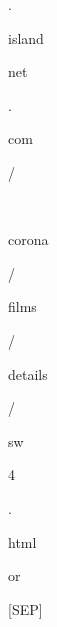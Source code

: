 \documentclass[varwidth=150mm]{standalone}
\begin{document}
\begin{CJK*}{UTF8}{gbsn}
{{{\colorbox{red!0.0}{\strut .} \colorbox{red!12.298245429992676}{\strut island}\colorbox{red!1.145770788192749}{\strut net} \colorbox{red!0.0}{\strut .} \colorbox{red!0.0}{\strut com} \colorbox{red!0.0}{\strut /} \colorbox{red!1.0570756196975708}{\strut ~} \colorbox{red!22.668542861938477}{\strut corona} \colorbox{red!0.0}{\strut /} \colorbox{red!6.098611354827881}{\strut films} \colorbox{red!0.0}{\strut /} \colorbox{red!1.0084270238876343}{\strut details} \colorbox{red!0.0}{\strut /} \colorbox{red!4.348813056945801}{\strut sw}\colorbox{red!0.0}{\strut 4} \colorbox{red!0.0}{\strut .} \colorbox{red!2.6619744300842285}{\strut html} \colorbox{red!10.214619636535645}{\strut or} \colorbox{red!0.0}{\strut [SEP]}
}}}
\end{CJK*}
\end{document}

